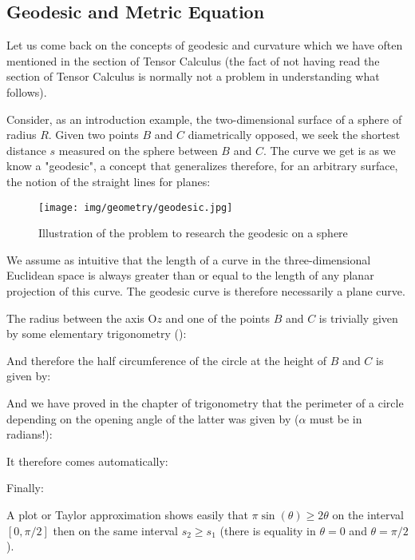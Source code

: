 	\subsection{Geodesic and Metric Equation}
	
	Let us come back on the concepts of geodesic and curvature which we have often mentioned in the section of Tensor Calculus (the fact of not having read the section of Tensor Calculus is normally not a problem in understanding what follows).
	
	Consider, as an introduction example, the two-dimensional surface of a sphere of radius $R$. Given two points $B$ and $C$ diametrically opposed, we seek the shortest distance $s$ measured on the sphere between $B$ and $C$. The curve we get is as we know a "geodesic", a concept that generalizes therefore, for an arbitrary surface, the notion of the straight lines for planes:
	
	\begin{figure}[H]
		\centering
		\texttt{[image: img/geometry/geodesic.jpg]}
		\caption{Illustration of the problem to research the geodesic on a sphere}
	\end{figure}
	
	\begin{tcolorbox}[title=Remark,colframe=black,arc=10pt]
	We assume as intuitive that the length of a curve in the three-dimensional Euclidean space is always greater than or equal to the length of any planar projection of this curve. The geodesic curve is therefore necessarily a plane curve.
	\end{tcolorbox}
	
	The radius between the axis $\text{O}z$ and one of the points $B$ and $C$ is trivially given by some elementary trigonometry ():
	
	And therefore the half circumference of the circle at the height of $B$ and $C$ is given by:
	
	And we have proved in the chapter of trigonometry that the perimeter of a circle depending on the opening angle of the latter was given by ($\alpha$ must be in radians!):
	
	It therefore comes automatically:
	
	Finally:
	
	A plot or Taylor approximation shows easily that $\pi\sin(\theta)\geq 2\theta$ on the interval $[0,\pi/2]$ then on the same interval $s_2 \geq s_1$ (there is equality in $\theta=0$ and $\theta=\pi/2$).
	
